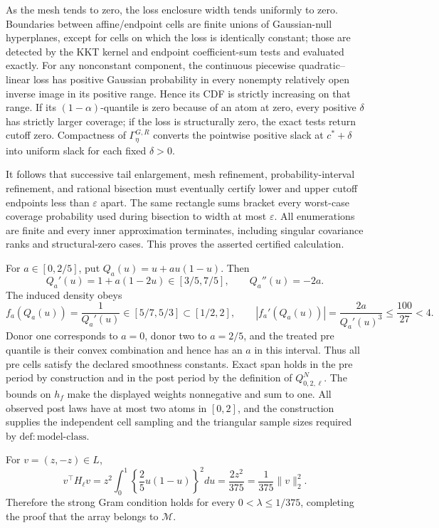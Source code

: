 As the mesh tends to zero, the loss enclosure width tends uniformly to zero.  Boundaries between affine/endpoint cells are finite unions of Gaussian-null hyperplanes, except for cells on which the loss is identically constant; those are detected by the KKT kernel and endpoint coefficient-sum tests and evaluated exactly.  For any nonconstant component, the continuous piecewise quadratic--linear loss has positive Gaussian probability in every nonempty relatively open inverse image in its positive range.  Hence its CDF is strictly increasing on that range.  If its \((1-\alpha)\)-quantile is zero because of an atom at zero, every positive \(\delta\) has strictly larger coverage; if the loss is structurally zero, the exact tests return cutoff zero.  Compactness of \(\Gamma_\eta^{G,R}\) converts the pointwise positive slack at \(c^*+\delta\) into uniform slack for each fixed \(\delta>0\).

It follows that successive tail enlargement, mesh refinement, probability-interval refinement, and rational bisection must eventually certify lower and upper cutoff endpoints less than \(\varepsilon\) apart.  The same rectangle sums bracket every worst-case coverage probability used during bisection to width at most \(\varepsilon\).  All enumerations are finite and every inner approximation terminates, including singular covariance ranks and structural-zero cases.  This proves the asserted certified calculation.

For \(a\in[0,2/5]\), put \(Q_a(u)=u+au(1-u)\).  Then
\[
 Q_a'(u)=1+a(1-2u)\in[3/5,7/5],
 \qquad Q_a''(u)=-2a.
\]
The induced density obeys
\[
 f_a(Q_a(u))=\frac1{Q_a'(u)}\in[5/7,5/3]\subset[1/2,2],
 \qquad
 |f_a'(Q_a(u))|=\frac{2a}{Q_a'(u)^3}
 \leq\frac{100}{27}<4.
\]
Donor one corresponds to \(a=0\), donor two to \(a=2/5\), and the treated pre quantile is their convex combination and hence has an \(a\) in this interval.  Thus all pre cells satisfy the declared smoothness constants.  Exact span holds in the pre period by construction and in the post period by the definition of \(Q^N_{0,2,\ell}\).  The bounds on \(h_f\) make the displayed weights nonnegative and sum to one.  All observed post laws have at most two atoms in \([0,2]\), and the construction supplies the independent cell sampling and the triangular sample sizes required by \(\mathrm{def:model\mbox{-}class}\).

For \(v=(z,-z)\in L\),
\[
 v^\top H_\ell v=z^2\int_0^1
 \left\{\frac25u(1-u)\right\}^2du
 =\frac{2z^2}{375}=\frac1{375}\|v\|_2^2.
\]
Therefore the strong Gram condition holds for every
\(0<\lambda\leq1/375\), completing the proof that the array belongs to \(\mathcal M\).

